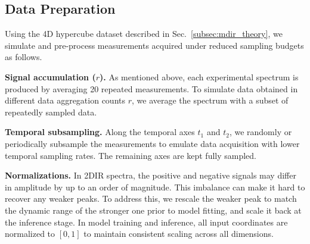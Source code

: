 \documentclass{optica-article}
\begin{document}




\subsection{Data Preparation}
\label{subsec:data_prep}

Using the 4D hypercube dataset described in Sec.~\ref{subsec:mdir_theory}, we simulate and pre-process measurements acquired under reduced sampling budgets as follows.

\noindent \textbf{Signal accumulation ($r$).} As mentioned above, each experimental spectrum is produced by averaging 20 repeated measurements. To simulate data obtained in different data aggregation counts $r$, we average the spectrum with a subset of repeatedly sampled data.

\noindent \textbf{Temporal subsampling.} Along the temporal axes $t_1$ and $t_2$, we randomly or periodically subsample the measurements to emulate data acquisition with lower temporal sampling rates. The remaining axes are kept fully sampled.

\noindent \textbf{Normalizations.}
In 2DIR spectra, the positive and negative signals may differ in amplitude by up to an order of magnitude. This imbalance can make it hard to recover any weaker peaks. To address this, we rescale the weaker peak to match the dynamic range of the stronger one prior to model fitting, and scale it back at the inference stage. In model training and inference, all input coordinates are normalized to $[0,1]$ to maintain consistent scaling across all dimensions.
\end{document}
